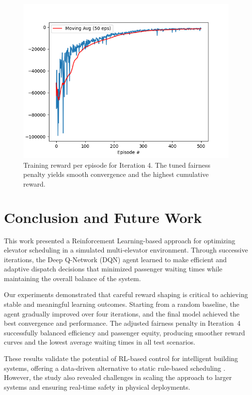 \documentclass[conference]{IEEEtran}
\begin{document}
\begin{figure}[H]
\centering
\includegraphics[width=\columnwidth]{4_total_reward_per_episode.png}
\caption{Training reward per episode for Iteration 4. The tuned fairness penalty yields smooth convergence and the highest cumulative reward.}
\label{fig:iter4}
\end{figure}

\section{Conclusion and Future Work}
This work presented a Reinforcement Learning-based approach for optimizing elevator scheduling in a simulated multi-elevator environment. Through successive iterations, the Deep Q-Network (DQN) agent \cite{mnih2015human} learned to make efficient and adaptive dispatch decisions that minimized passenger waiting times while maintaining the overall balance of the system.

Our experiments demonstrated that careful reward shaping is critical to achieving stable and meaningful learning outcomes. Starting from a random baseline, the agent gradually improved over four iterations, and the final model achieved the best convergence and performance. The adjusted fairness penalty in Iteration~4 successfully balanced efficiency and passenger equity, producing smoother reward curves and the lowest average waiting times in all test scenarios.

These results validate the potential of RL-based control for intelligent building systems, offering a data-driven alternative to static rule-based scheduling \cite{fan2019application}. However, the study also revealed challenges in scaling the approach to larger systems and ensuring real-time safety in physical deployments.
\end{document}

